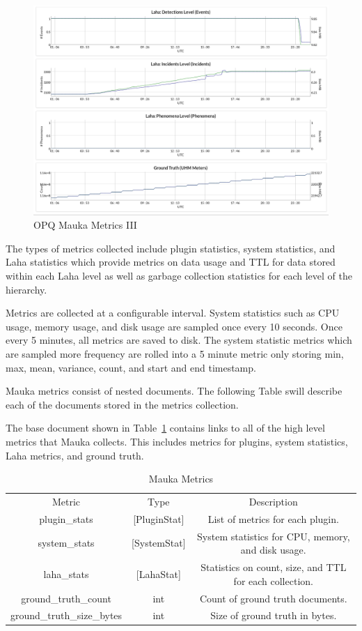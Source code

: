 \begin{figure}
	\centering
	\includegraphics[width=\linewidth]{figures/metrics_3.png}
	\caption{OPQ Mauka Metrics III}
	\label{fig:Metrics3}
\end{figure}

The types of metrics collected include plugin statistics, system statistics, and Laha statistics which provide metrics on data usage and TTL for data stored within each Laha level as well as garbage collection statistics for each level of the hierarchy.

Metrics are collected at a configurable interval. System statistics such as CPU usage, memory usage, and disk usage are sampled once every 10 seconds. Once every 5 minutes, all metrics are saved to disk. The system statistic metrics which are sampled more frequency are rolled into a 5 minute metric only storing min, max, mean, variance, count, and start and end timestamp.

Mauka metrics consist of nested documents. The following Table swill describe each of the documents stored in the metrics collection.

The base document shown in Table~\ref{table:Metrics} contains links to all of the high level metrics that Mauka collects. This includes metrics for plugins, system statistics, Laha metrics, and ground truth.

\begin{table}[H]
	\centering
	\caption{Mauka Metrics}
	\begin{tabular}{|c|c|c|}
		\hline
		Metric & Type & Description \\
		plugin\_stats & [PluginStat] & List of metrics for each plugin. \\
		\hline
		system\_stats & [SystemStat] & System statistics for CPU, memory, and disk usage. \\
		\hline
		laha\_stats & [LahaStat] & Statistics on count, size, and TTL for each collection. \\
		\hline
		ground\_truth\_count & int & Count of ground truth documents. \\
		\hline
		ground\_truth\_size\_bytes & int & Size of ground truth in bytes. \\
		\hline
	\end{tabular}
	\label{table:Metrics}
\end{table}

